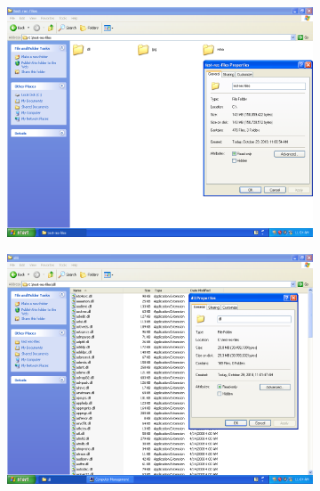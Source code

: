 \documentclass[
	a4paper,
	oneside,
	DIV = 12,
	fontsize = 13pt,
	headings = normal,
]{scrartcl}
\begin{document}
		\begin{figure}
			\centering
			\begin{subfigure}{0.5\columnwidth}
				\centering
				\includegraphics[height = 9\baselineskip]{./assets/y03s01-pcdiag-lab-03-p01.png}
				\caption{}
				\label{subfig:01-01-root}
			\end{subfigure}%
			\begin{subfigure}{0.5\columnwidth}
				\centering
				\includegraphics[height = 9\baselineskip]{./assets/y03s01-pcdiag-lab-03-p02.png}
				\caption{}
				\label{subfig:01-02-jpg}
			\end{subfigure}
			\begin{subfigure}{0.5\columnwidth}
				\centering

\end{subfigure}
\end{figure}
\end{document}
